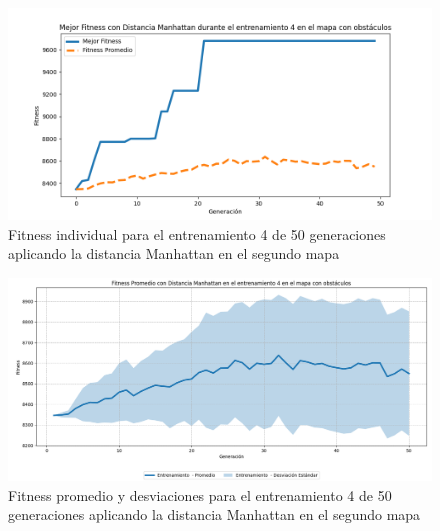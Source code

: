 \documentclass[conference]{IEEEtran}
\begin{document}
\begin{figure}[H]
    \centering
    \includegraphics[width=0.9 \linewidth]{Manhattan/Mapa2/Fitness_4_Map2_Manh_50Gen.png}
    \caption{Fitness individual para el entrenamiento 4 de 50 generaciones aplicando la distancia Manhattan en el segundo mapa}
    \label{fig:manh_4_50_m2}
\end{figure}
\begin{figure}[H]
    \centering
    \includegraphics[width=0.9 \linewidth]{Manhattan/Mapa2/Fitness_4_Map2_Manh_50Gen_Sombra.png}
    \caption{Fitness promedio y desviaciones para el entrenamiento 4 de 50 generaciones aplicando la distancia Manhattan en el segundo mapa}
    \label{fig:manh_4_50_sombra_m2}
\end{figure}
\end{document}
